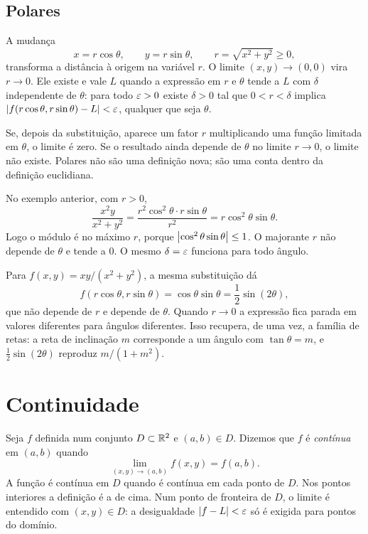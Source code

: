 \documentclass[11pt,a4paper]{article}
\begin{document}
\subsection{Polares}

A mudança
\[
x=r\cos\theta,\qquad y=r\sin\theta,\qquad r=\sqrt{x^2+y^2}\ge 0,
\]
transforma a distância à origem na variável $r$. O limite $(x,y)\to(0,0)$ vira $r\to 0$. Ele existe e vale $L$ quando a expressão em $r$ e $\theta$ tende a $L$ com $\delta$ independente de $\theta$: para todo $\varepsilon>0$ existe $\delta>0$ tal que $0<r<\delta$ implica $\left\lvert f(r\cos\theta,r\sin\theta)-L \right\rvert<\varepsilon$, qualquer que seja $\theta$.

Se, depois da substituição, aparece um fator $r$ multiplicando uma função limitada em $\theta$, o limite é zero. Se o resultado ainda depende de $\theta$ no limite $r\to 0$, o limite não existe. Polares não são uma definição nova; são uma conta dentro da definição euclidiana.

\begin{exemplo}
No exemplo anterior, com $r>0$,
\[
\frac{x^2 y}{x^2+y^2}
=\frac{r^2\cos^2\theta\cdot r\sin\theta}{r^2}
=r\cos^2\theta\sin\theta.
\]
Logo o módulo é no máximo $r$, porque $\left\lvert \cos^2\theta\sin\theta \right\rvert\le 1$. O majorante $r$ não depende de $\theta$ e tende a $0$. O mesmo $\delta=\varepsilon$ funciona para todo ângulo.
\end{exemplo}

\begin{exemplo}
Para $f(x,y)=xy/(x^2+y^2)$, a mesma substituição dá
\[
f(r\cos\theta,r\sin\theta)=\cos\theta\sin\theta=\frac{1}{2}\sin(2\theta),
\]
que não depende de $r$ e depende de $\theta$. Quando $r\to 0$ a expressão fica parada em valores diferentes para ângulos diferentes. Isso recupera, de uma vez, a família de retas: a reta de inclinação $m$ corresponde a um ângulo com $\tan\theta=m$, e $\frac{1}{2}\sin(2\theta)$ reproduz $m/(1+m^2)$.
\end{exemplo}

\section{Continuidade}

\begin{definicao}
Seja $f$ definida num conjunto $D\subset\mathbb{R}^2$ e $(a,b)\in D$. Dizemos que $f$ é \emph{contínua} em $(a,b)$ quando
\[
\lim_{(x,y)\to(a,b)} f(x,y)=f(a,b).
\]
A função é contínua em $D$ quando é contínua em cada ponto de $D$. Nos pontos interiores a definição é a de cima. Num ponto de fronteira de $D$, o limite é entendido com $(x,y)\in D$: a desigualdade $\left\lvert f-L \right\rvert<\varepsilon$ só é exigida para pontos do domínio.
\end{definicao}
\end{document}
